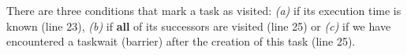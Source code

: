 There are three conditions that mark a task as visited: \textit{(a)} if its execution time is known (line 23),  \textit{(b)} if \textbf{all} of its successors are visited (line 25) or \textit{(c)} if we have encountered a taskwait (barrier) after the creation of this task (line 25).
%

